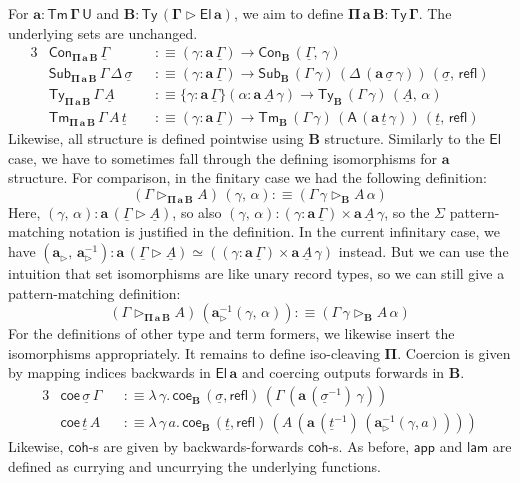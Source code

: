\documentclass[12pt,a4paper,twoside,openany]{book}
\theoremstyle{remark}
\theoremstyle{definition}
\theoremstyle{theorem}
\newcommand{\bs}[1]{\boldsymbol{#1}}
\newcommand{\refl}{\mathsf{refl}}
\newcommand{\Con}{\mathsf{Con}}
\newcommand{\Sub}{\mathsf{Sub}}
\newcommand{\Tm}{\mathsf{Tm}}
\newcommand{\Ty}{\mathsf{Ty}}
\newcommand{\U}{\mathsf{U}}
\newcommand{\El}{\mathsf{El}}
\newcommand{\ext}{\triangleright}
\newcommand{\appi}{\mathsf{app}}
\newcommand{\lami}{\mathsf{lam}}
\newcommand{\A}{\mathsf{A}}
\newcommand{\bTy}{\bs{\Ty}}
\newcommand{\bGamma}{\bs{\Gamma}}
\newcommand{\ba}{\bs{a}}
\newcommand{\bB}{\bs{B}}
\newcommand{\bEl}{\bs{\El}}
\newcommand{\ul}[1]{\underline{#1}}
\newcommand{\ulGamma}{\ul{\Gamma}}
\newcommand{\ulsigma}{\ul{\sigma}}
\newcommand{\ult}{\ul{t}}
\newcommand{\ulA}{\ul{A}}
\newcommand{\coe}{\mathsf{coe}}
\newcommand{\coh}{\mathsf{coh}}
\newcommand{\defn}{:\equiv}
\begin{document}
For $\boldsymbol{a : \Tm\,\Gamma\,\U}$ and $\boldsymbol{B :
  \Ty\,(\Gamma\ext\El\,a)}$, we aim to define $\boldsymbol{\Pi\,a\,B}
\boldsymbol{:} \bTy\,\bGamma$. The underlying sets are unchanged.
\begin{alignat*}{3}
  & \Con_{\bs{\Pi\,a\,B}}\,\ulGamma &&\defn (\gamma : \ba\,\ulGamma) \to \Con_{\bB}\,(\ulGamma,\,\gamma)\\
  & \Sub_{\bs{\Pi\,a\,B}}\,\Gamma\,\Delta\,\ulsigma &&\defn
    (\gamma : \ba\,\ulGamma)\to \Sub_{\bB}\,(\Gamma\,\gamma)\,(\Delta\,(\ba\,\ulsigma\,\gamma))\,(\ulsigma,\,\refl)\\
  & \Ty_{\bs{\Pi\,a\,B}}\,\Gamma\,\ulA &&\defn
  \{\gamma : \ba\,\ulGamma\}(\alpha : \ba\,\ulA\,\gamma)
  \to \Ty_{\bB}\,(\Gamma\,\gamma)\,(\ulA,\,\alpha)\\
  & \Tm_{\bs{\Pi\,a\,B}}\,\Gamma\,A\,\ult &&\defn
    (\gamma : \ba\,\ulGamma) \to \Tm_{\bB}\,(\Gamma\,\gamma)\,(\A\,(\ba\,\ult\,\gamma))\,(\ult,\,\refl)
\end{alignat*}
Likewise, all structure is defined pointwise using $\bB$ structure. Similarly to
the $\bEl$ case, we have to sometimes fall through the defining isomorphisms for
$\ba$ structure. For comparison, in the finitary case we had the following definition:
\[
  (\Gamma \ext_{\bs{\Pi\,a\,B}} A)\,(\gamma,\,\alpha) \defn (\Gamma\,\gamma \ext_{\bB} A\,\alpha)
\]
Here, $(\gamma,\,\alpha) : \ba\,(\ulGamma \ext \ulA)$, so also
$(\gamma,\,\alpha) : (\gamma : \ba\,\ulGamma) \times \ba\,\ulA\,\gamma$, so the
$\Sigma$ pattern-matching notation is justified in the definition. In the
current infinitary case, we have $(\ba_{\ext},\,\ba_{\ext}^{-1}) :
\ba\,(\ulGamma \ext \ulA) \simeq ((\gamma : \ba\,\ulGamma) \times
\ba\,\ulA\,\gamma)$ instead. But we can use the intuition that set isomorphisms
are like unary record types, so we can still give a pattern-matching definition:
\[
  (\Gamma \ext_{\bs{\Pi\,a\,B}} A)\,(\ba_{\ext}^{-1}(\gamma,\,\alpha)) \defn
   (\Gamma\,\gamma \ext_{\bB} A\,\alpha)
\]
For the definitions of other type and term formers, we likewise insert the
isomorphisms appropriately. It remains to define iso-cleaving
$\bs{\Pi}$. Coercion is given by mapping indices backwards in $\bEl\,\ba$ and
coercing outputs forwards in $\bB$.
\begin{alignat*}{3}
  & \coe\,\ulsigma\,\Gamma &&\defn
    \lambda\,\gamma.\,\coe_{\bB}\,(\ulsigma,\refl)\,(\Gamma\,(\ba\,(\ulsigma^{-1})\,\gamma))\\
  & \coe\,\ult\,A &&\defn
    \lambda\,\gamma\,a.\,\coe_{\bB}\,(\ult,\refl)\,(A\,(\ba\,(\ult^{-1})\,(\ba_{\ext}^{-1}(\gamma,a))))
\end{alignat*}
Likewise, $\coh$-s are given by backwards-forwards $\coh$-s. As before,
$\bs{\appi}$ and $\bs{\lami}$ are defined as currying and uncurrying the
underlying functions.
\end{document}
